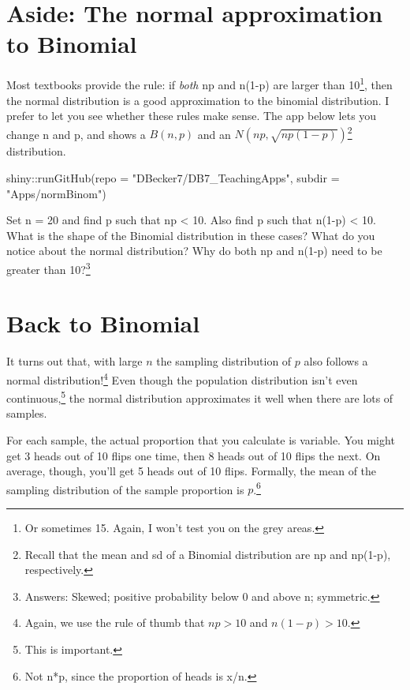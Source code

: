 \documentclass[
  letterpaper,
  DIV=11,
  numbers=noendperiod]{scrreprt}
\newenvironment{Shaded}{\begin{snugshade}}{\end{snugshade}}
\newcommand{\AttributeTok}[1]{\textcolor[rgb]{0.40,0.45,0.13}{#1}}
\newcommand{\FunctionTok}[1]{\textcolor[rgb]{0.28,0.35,0.67}{#1}}
\newcommand{\NormalTok}[1]{\textcolor[rgb]{0.00,0.23,0.31}{#1}}
\newcommand{\SpecialCharTok}[1]{\textcolor[rgb]{0.37,0.37,0.37}{#1}}
\newcommand{\StringTok}[1]{\textcolor[rgb]{0.13,0.47,0.30}{#1}}
\begin{document}
\hypertarget{aside-the-normal-approximation-to-binomial}{%
\section{Aside: The normal approximation to
Binomial}\label{aside-the-normal-approximation-to-binomial}}

Most textbooks provide the rule: if \emph{both} np and n(1-p) are larger
than 10\footnote{Or sometimes 15. Again, I won't test you on the grey
  areas.}, then the normal distribution is a good approximation to the
binomial distribution. I prefer to let you see whether these rules make
sense. The app below lets you change n and p, and shows a \(B(n, p)\)
and an \(N(np, \sqrt{np(1-p)})\)\footnote{Recall that the mean and sd of
  a Binomial distribution are np and np(1-p), respectively.}
distribution.

\begin{Shaded}
\begin{Highlighting}[]
\NormalTok{shiny}\SpecialCharTok{::}\FunctionTok{runGitHub}\NormalTok{(}\AttributeTok{repo =} \StringTok{"DBecker7/DB7\_TeachingApps"}\NormalTok{, }
    \AttributeTok{subdir =} \StringTok{"Apps/normBinom"}\NormalTok{)}
\end{Highlighting}
\end{Shaded}

Set n = 20 and find p such that np \textless{} 10. Also find p such that
n(1-p) \textless{} 10. What is the shape of the Binomial distribution in
these cases? What do you notice about the normal distribution? Why do
both np and n(1-p) need to be greater than 10?\footnote{Answers: Skewed;
  positive probability below 0 and above n; symmetric.}

\hypertarget{back-to-binomial}{%
\section{Back to Binomial}\label{back-to-binomial}}

It turns out that, with large \(n\) the sampling distribution of \(p\)
also follows a normal distribution!\footnote{Again, we use the rule of
  thumb that \(np>10\) and \(n(1-p)>10\).} Even though the population
distribution isn't even continuous,\footnote{This is important.} the
normal distribution approximates it well when there are lots of samples.

For each sample, the actual proportion that you calculate is variable.
You might get 3 heads out of 10 flips one time, then 8 heads out of 10
flips the next. On average, though, you'll get 5 heads out of 10 flips.
Formally, the mean of the sampling distribution of the sample proportion
is \(p\).\footnote{Not n*p, since the proportion of heads is x/n.}
\end{document}
